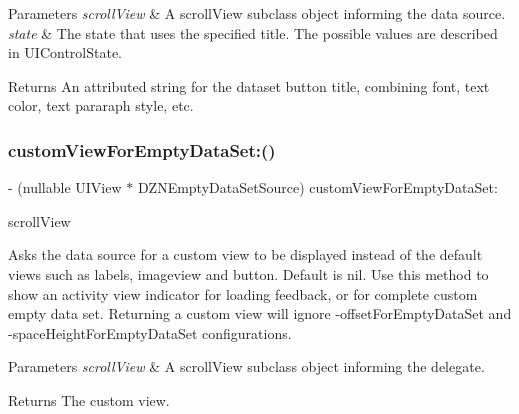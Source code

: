 \begin{DoxyParams}{Parameters}
{\em scroll\+View} & A scroll\+View subclass object informing the data source. \\
\hline
{\em state} & The state that uses the specified title. The possible values are described in U\+I\+Control\+State. \\
\hline
\end{DoxyParams}
\begin{DoxyReturn}{Returns}
An attributed string for the dataset button title, combining font, text color, text pararaph style, etc. 
\end{DoxyReturn}
\mbox{\label{protocol_d_z_n_empty_data_set_source_01-p_a0af329a457d227385ec1776b0e11eedb}} 
\subsubsection{\texorpdfstring{custom\+View\+For\+Empty\+Data\+Set\+:()}{customViewForEmptyDataSet:()}}
{\footnotesize\ttfamily -\/ (nullable U\+I\+View $\ast$ D\+Z\+N\+Empty\+Data\+Set\+Source) custom\+View\+For\+Empty\+Data\+Set\+: \begin{DoxyParamCaption}\item[{(U\+I\+Scroll\+View $\ast$)}]{scroll\+View }\end{DoxyParamCaption}\hspace{0.3cm}{\ttfamily [optional]}}

Asks the data source for a custom view to be displayed instead of the default views such as labels, imageview and button. Default is nil. Use this method to show an activity view indicator for loading feedback, or for complete custom empty data set. Returning a custom view will ignore -\/offset\+For\+Empty\+Data\+Set and -\/space\+Height\+For\+Empty\+Data\+Set configurations.


\begin{DoxyParams}{Parameters}
{\em scroll\+View} & A scroll\+View subclass object informing the delegate. \\
\hline
\end{DoxyParams}
\begin{DoxyReturn}{Returns}
The custom view. 
\end{DoxyReturn}
\mbox{\label{protocol_d_z_n_empty_data_set_source_01-p_a50ef161cf4d911ea5f85a3bdaa8ac714}} 
